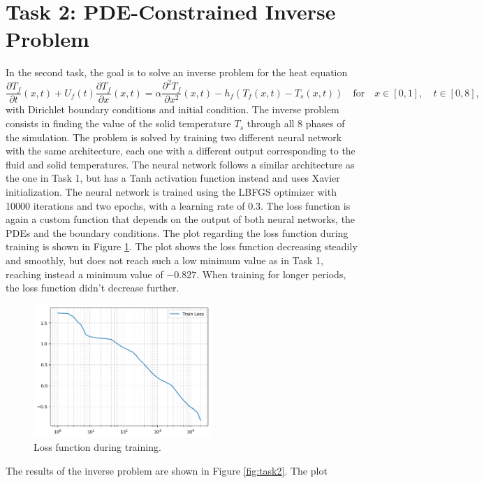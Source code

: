 \documentclass[unicode,11pt,a4paper,oneside,numbers=endperiod,openany]{scrartcl}
\begin{document}
\section{Task 2: PDE-Constrained Inverse Problem}
In the second task, the goal is to solve an inverse problem for the heat
equation
\begin{equation}
    \frac{\partial T_f}{\partial t}(x,t) + U_f(t)\frac{\partial T_f}{\partial x}(x,t) = \alpha \frac{\partial^2 T_f}{\partial x^2} (x,t) - h_f(T_f(x,t)-T_s(x,t)) \quad \text{for} \quad x \in [0, 1], \quad t \in [0, 8],
\end{equation}
with Dirichlet boundary conditions and initial condition. The inverse problem
consists in finding the value of the solid temperature $T_s$ through all 8
phases of the simulation. The problem is solved by training two different neural
network with the same architecture, each one with a different output
corresponding to the fluid and solid temperatures. The neural network follows a
similar architecture as the one in Task 1, but has a Tanh activation function
instead and uses Xavier initialization. 
The neural network is trained using the
LBFGS optimizer with 10000 iterations and two epochs, with a learning rate of 0.3. The loss
function is again a custom function that depends on the output of both neural
networks, the PDEs and the boundary conditions. The plot regarding the loss
function during training is shown in Figure \ref{fig:task2_loss}. The plot shows
the loss function decreasing steadily and smoothly, but does not reach such a
low minimum value as in Task 1, reaching instead a minimum value of $-0.827$.
When training for longer periods, the loss function didn't decrease further.
\begin{figure}
    \centering
    \includegraphics[width=0.6\textwidth]{../Proj1_Y24/Task2/loss.png}
    \caption{Loss function during training.}
    \label{fig:task2_loss}
\end{figure}
The results of the inverse problem are shown in Figure \ref{fig:task2}. The plot
\end{document}
